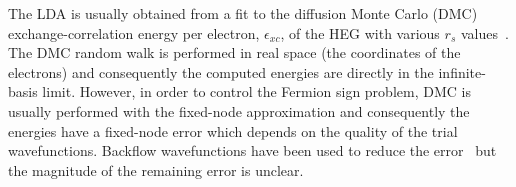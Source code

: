 The LDA is usually obtained from a fit to the diffusion Monte Carlo (DMC) exchange-correlation energy
per electron, $\epsilon_{xc}$, of the HEG with various $r_s$ values~\cite{CepAld-PRL-80}.
The DMC random walk is performed in real space (the coordinates of the electrons) and consequently
the computed energies are directly in the infinite-basis limit.
However, in order to control the Fermion sign problem, DMC is usually performed with the fixed-node approximation
and consequently the energies have a fixed-node error which depends on the
quality of the trial wavefunctions.
Backflow wavefunctions have been used to reduce the error~\cite{kwon1998effects,RioMaDruTowNee-PRE-06}
but the magnitude of the remaining error is unclear.


